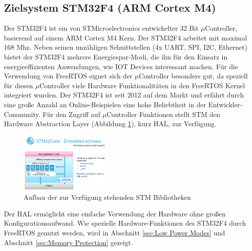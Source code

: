 \subsection{Zielsystem STM32F4 (ARM Cortex M4)}
\label{sec:Zielsysteme}
Der STM32F4 ist ein von STMicroelectronics entwickelter 32 Bit $\mu$Controller, basierend auf einem ARM Cortex M4 Kern. Der STM32F4 arbeitet mit maximal 168 Mhz. \newline
Neben seinen unzähligen Schnittstellen (4x UART, SPI, I2C, Ethernet) bietet der STM32F4 mehrere Energiespar-Modi, die ihn für den Einsatz in energieeffizienten Anwendungen, wie IOT Devices interessant machen. Für die Verwendung von FreeRTOS eignet sich der $\mu$Controller besonders gut, da speziell für diesen $\mu$Controller viele Hardware Funk\-tio\-na\-li\-tät\-en in den FreeRTOS Kernel integriert wurden. Der STM32F4 ist seit 2012 auf dem Markt und erfährt durch eine große Anzahl an Online-Beispielen eine hohe Beliebtheit in der Entwickler-Community. Für den Zugriff auf $\mu$Controller Funktionen stellt STM den Hardware Abstraction Layer (Abbildung \ref{fig:HAL}), kurz HAL, zur Ver\-fü\-gung.      
\begin{figure}[htb!]
	\centering
		\includegraphics[width=0.4\textwidth]{Pictures/STM32F4/LibraryEntry.png}
	\caption{Aufbau der zur Verfügung stehenden STM Bibliotheken }
	\label{fig:HAL}
\end{figure}
\newline
Der HAL ermöglicht eine einfache Verwendung der Hardware ohne großen Konfigurationsaufwand. Wie spezielle Hardware-Funktionen des STM32F4 durch FreeRTOS genutzt werden, wird in Abschnitt \ref{sec:Low Power Modes} und Abschnitt \ref{sec:Memory Protection} gezeigt.